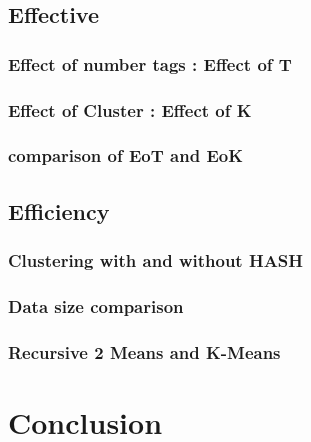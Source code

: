 \documentclass[runningheads,a4paper]{llncs}
\begin{document}
\subsection{Effective}
\subsubsection{Effect of number tags : Effect of T}
\subsubsection{Effect of Cluster : Effect of K}
\subsubsection{comparison of EoT and EoK}
\subsection{Efficiency}
\subsubsection{Clustering with and without HASH}
\subsubsection{Data size comparison}
\subsubsection{Recursive 2 Means and K-Means}

\section{Conclusion}\label{sec-con}



\end{document}
